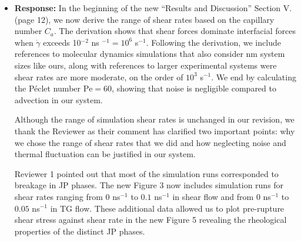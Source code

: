 \documentclass[11pt]{article}
\begin{document}
\begin{itemize}
\item {\bf Response:}
  In the beginning  of the new ``Results and Discussion'' Section V. (page 12),
  we now derive the range of shear rates 
  based on the capillary number $C_a$.  The derivation shows that shear forces dominate
  interfacial forces when $\dot \gamma$ exceeds
  10$^{-2}$ ns $^{-1} = 10^6$ s$^{-1}$.  Following the derivation,
  we include references to molecular dynamics simulations that also
  consider nm system sizes like ours, along with references to
  larger experimental systems were shear rates are more moderate,
  on the order of $10^3$ s$^{-1}$.  We end by calculating the
  P\'eclet number $\mathrm{Pe} = 60$, showing that
  noise is negligible compared to advection in our system.  

  Although the range of simulation shear rates is unchanged in our
  revision, we thank the Reviewer as their comment has clarified
  two important points: why we chose the range of shear
  rates that we did and how neglecting noise and
  thermal fluctuation can be justified in our system.

  Reviewer 1 pointed out that most of the simulation runs
  corresponded to breakage in JP phases. The new Figure 3
  now includes simulation runs for shear rates ranging
  from $0$ ns$^{-1}$ to $0.1$ ns$^{-1}$ in shear flow
  and from $0$ ns$^{-1}$ to $0.05$ ns$^{-1}$ in TG flow.
  These additional data allowed us to plot pre-rupture
  shear stress against shear rate in the new Figure 5
  revealing the rheological properties of the distinct
  JP phases. 
\end{itemize}
\end{document}
